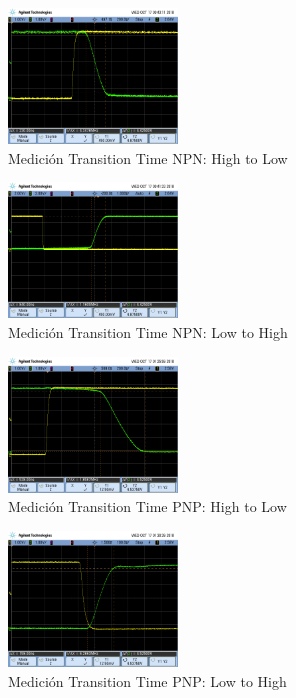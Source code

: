 \begin{multicols}{2}
\begin{figure}[H]%
  \centering
    \includegraphics[width=0.4\textwidth]{ejercicio1/tHL-NPN}
    \caption{Medición Transition Time NPN: High to Low} %
\end{figure}

\begin{figure}[H]
  \centering
    \includegraphics[width=0.4\textwidth]{ejercicio1/tLH-NPN}
    \caption{Medición Transition Time NPN: Low to High} %
\end{figure}

\begin{figure}[H]
  \centering
    \includegraphics[width=0.4\textwidth]{ejercicio1/tHL-PNP}
    \caption{Medición Transition Time PNP: High to Low} %
\end{figure}

\begin{figure}[H]
  \centering
    \includegraphics[width=0.4\textwidth]{ejercicio1/tLH-PNP}
    \caption{Medición Transition Time PNP: Low to High} %
\end{figure}


\end{multicols}
